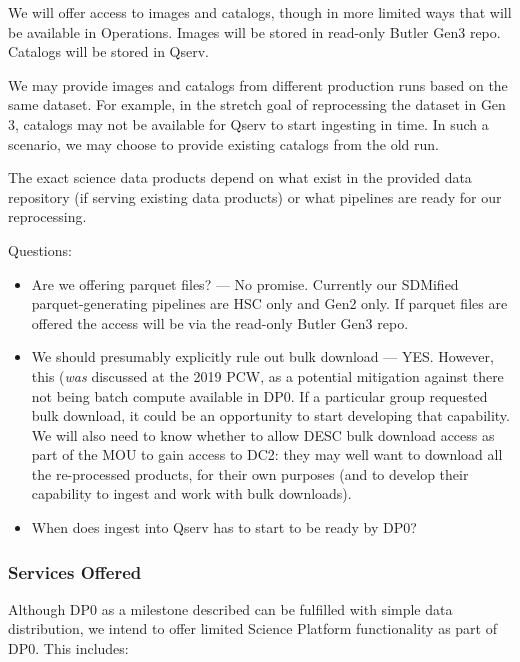 We will offer access to images and catalogs, though in more limited ways that will be available in Operations.
Images will be stored in read-only Butler Gen3 repo.
Catalogs will be stored in Qserv.

We may provide images and catalogs from different production runs based on the same dataset.
For example, in the stretch goal of reprocessing the dataset in Gen 3, catalogs may not be available for Qserv to start ingesting in time. In such a scenario, we may choose to provide existing catalogs from the old run.

The exact science data products depend on what exist in the provided data repository (if serving existing data products) or what pipelines are ready for our reprocessing.

Questions:

\begin{itemize}

\item Are we offering parquet files? --- No promise. Currently our SDMified parquet-generating pipelines are HSC only and Gen2 only. If parquet files are offered the access will be via the read-only Butler Gen3 repo.

\item We should presumably explicitly rule out bulk download  --- YES. However, this ({\it was} discussed at the 2019 PCW, as a potential mitigation against there not being batch compute available in DP0. If a particular group requested bulk download, it could be an opportunity to start developing that capability. We will also need to know whether to allow DESC bulk download access as part of the MOU to gain access to DC2: they may well want to download all the re-processed products, for their own purposes (and to develop their capability to ingest and work with bulk downloads).

\item When does ingest into Qserv has to start to be ready by DP0?

\end{itemize}

\subsubsection{Services Offered}

Although DP0 as a milestone described  can be fulfilled with simple data distribution, we intend to offer limited Science Platform functionality as part of DP0. This includes:

